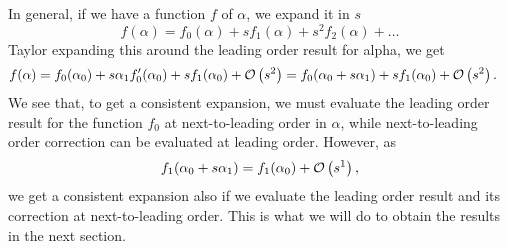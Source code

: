 In general, if we have a function $f$ of $\alpha$, we expand it in $s$
\begin{equation}
    f(\alpha) = f_0(\alpha) + s f_1(\alpha) + s^2 f_2(\alpha) + \dots
\end{equation}
Taylor expanding this around the leading order result for alpha, we get
\begin{align*}
    f(\alpha) 
    & 
    = 
    f_0(\alpha_0)
    +
    s\alpha_1  f_0'(\alpha_0)
    +
    s f_1(\alpha_0)
    + \Oh[2]{s}
    = f_0(\alpha_0 + s \alpha_1)
    + s f_1(\alpha_0)
    + \Oh[2]{s}.
\end{align*}
We see that, to get a consistent expansion, we must evaluate the leading order result for the function $f_0$ at next-to-leading order in $\alpha$, while next-to-leading order correction can be evaluated at leading order.
However, as
\begin{equation}
    f_1(\alpha_0 + s\alpha_1) = f_1(\alpha_0) + \Oh[1]{s},
\end{equation}
we get a consistent expansion also if we evaluate the leading order result and its correction at next-to-leading order.
This is what we will do to obtain the results in the next section.


